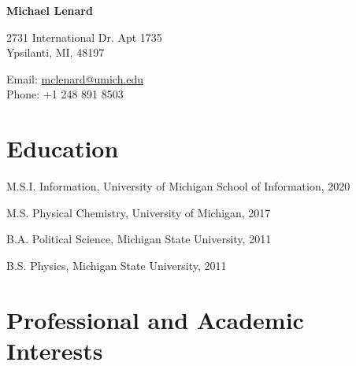 \documentclass[12pt,letterpaper]{report}
\newcommand{\myname}{Michael Lenard}
\newcommand{\namefont}[1]{{\normalfont\bfseries\Huge{#1}}}
\begin{document}
 \raggedright

\namefont{\myname}

\vspace{1em}
\begin{minipage}[t]{0.68\textwidth}
        2731 International Dr. Apt 1735 \\
Ypsilanti, MI, 48197
\end{minipage}
\begin{minipage}[t]{0.31\textwidth}
        Email: \href{mailto:mclenard@umich.edu}{mclenard@umich.edu} \\
        Phone: +1 248 891 8503
\end{minipage}
\vspace{0.5em}



\section*{Education}

\begin{tablist}

	\item[M.S.I.] \tab Information, University of Michigan School of Information, 2020

	\item[M.S.]  \tab Physical Chemistry, University of Michigan, 2017

	\item[B.A.]  \tab Political Science, Michigan State University, 2011
        
	\item[B.S.]  \tab Physics, Michigan State University, 2011

\end{tablist}



\section*{Professional and Academic Interests}
\end{document}
